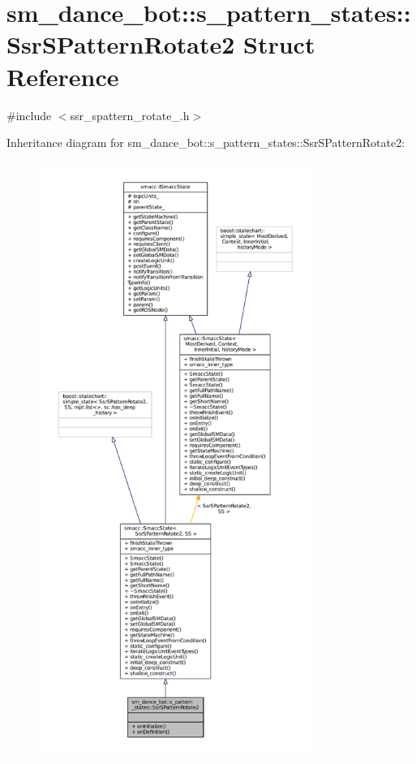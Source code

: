 \hypertarget{structsm__dance__bot_1_1s__pattern__states_1_1SsrSPatternRotate2}{}\section{sm\+\_\+dance\+\_\+bot\+:\+:s\+\_\+pattern\+\_\+states\+:\+:Ssr\+S\+Pattern\+Rotate2 Struct Reference}
\label{structsm__dance__bot_1_1s__pattern__states_1_1SsrSPatternRotate2}


{\ttfamily \#include $<$ssr\+\_\+spattern\+\_\+rotate\+\_.\+h$>$}



Inheritance diagram for sm\+\_\+dance\+\_\+bot\+:\+:s\+\_\+pattern\+\_\+states\+:\+:Ssr\+S\+Pattern\+Rotate2\+:
\nopagebreak
\begin{figure}[H]
\begin{center}
\leavevmode
\includegraphics[height=550pt]{structsm__dance__bot_1_1s__pattern__states_1_1SsrSPatternRotate2__inherit__graph}
\end{center}
\end{figure}


